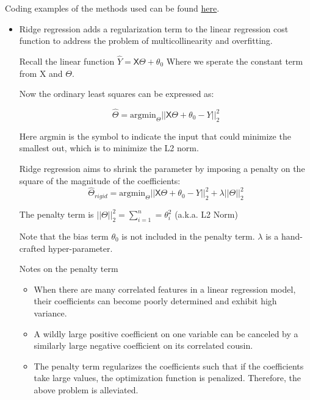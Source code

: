 \documentclass[letterpaper,12pt]{article}
\begin{document}
Coding examples of the methods used can be found
\href{https://colab.research.google.com/drive/1ENbxMw0y86eHTorCbd1riAVOQU25-GEO?usp=sharing}{here}.
\begin{itemize}
    \item Ridge regression adds a regularization term to the linear regression cost
          function to address the problem of multicollinearity and overfitting.

          Recall the linear function $\hat{Y}=\mathsf{X}\Theta+\theta_0$ Where we sperate
          the constant term from X and $\Theta$.

          Now the ordinary least squares can be expressed as:

          \[
              \hat{\Theta}=\text{argmin}_\Theta||\mathsf{X}\Theta+\theta_0-Y||_2^2
          \]

          Here argmin is the symbol to indicate the input that could minimize the
          smallest out, which is to minimize the L2 norm.

          Ridge regression aims to shrink the parameter by imposing a penalty on the square of
          the magnitude of the coefficients:
          \[
              \hat{\Theta}_{rigid}=\text{argmin}_\Theta||\mathsf{X}\Theta+\theta_0-Y||_2^2 + \lambda||\Theta||_2^2
          \]

          The penalty term is $||\Theta||_2^2=\sum_{i=1}^{n}=\theta_i^2$ (a.k.a. L2 Norm)

          Note that the bias term $\theta_0$ is not included in the penalty term.
          $\lambda$ is a hand-crafted hyper-parameter.

          Notes on the penalty term
          \begin{itemize}
              \item When there are many correlated features in a linear regression model, their
                    coefficients can become poorly determined and exhibit high variance.
              \item A wildly large positive coefficient on one variable can be canceled by a
                    similarly large negative coefficient on its correlated cousin.
              \item The penalty term regularizes the coefficients such that if the coefficients
                    take large values, the optimization function is penalized. Therefore, the above
                    problem is alleviated.
          \end{itemize}


\end{itemize}
\end{document}
